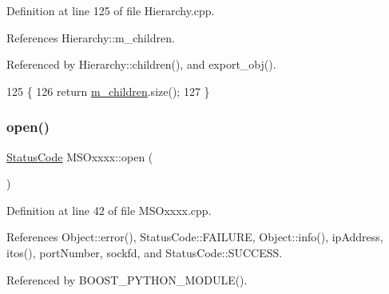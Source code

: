 Definition at line 125 of file Hierarchy.\+cpp.



References Hierarchy\+::m\+\_\+children.



Referenced by Hierarchy\+::children(), and export\+\_\+obj().


\begin{DoxyCode}
125                                            \{
126   \textcolor{keywordflow}{return} \hyperlink{classHierarchy_a038816763941fd4a930504917f60483b}{m\_children}.size();
127 \}
\end{DoxyCode}
\mbox{\label{classMSOxxxx_a4acff38c6f55795533c4d6b4cef6106b}} 
\subsubsection{\texorpdfstring{open()}{open()}}
{\footnotesize\ttfamily \hyperlink{classStatusCode}{Status\+Code} M\+S\+Oxxxx\+::open (\begin{DoxyParamCaption}{ }\end{DoxyParamCaption})}



Definition at line 42 of file M\+S\+Oxxxx.\+cpp.



References Object\+::error(), Status\+Code\+::\+F\+A\+I\+L\+U\+RE, Object\+::info(), ip\+Address, itos(), port\+Number, sockfd, and Status\+Code\+::\+S\+U\+C\+C\+E\+SS.



Referenced by B\+O\+O\+S\+T\+\_\+\+P\+Y\+T\+H\+O\+N\+\_\+\+M\+O\+D\+U\+L\+E().


